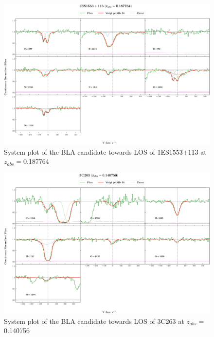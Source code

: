 \begin{landscape}


\begin{figure} 
  \centering  
  \hspace*{-21mm}
    \includegraphics[width=\linewidth]{Figures//system-plots/1ES1553+113_z=0.187764_sys_plot.png} 
  \caption{System plot of the BLA candidate towards LOS of 1ES1553+113 at $z_{abs}=$0.187764} 
\end{figure}



\begin{figure} 
  \centering  
  \hspace*{-21mm}
    \includegraphics[width=\linewidth]{Figures//system-plots/3C263_z=0.140756_sys_plot.png} 
  \caption{System plot of the BLA candidate towards LOS of 3C263 at $z_{abs}=$0.140756} 
\end{figure}




\end{landscape}
